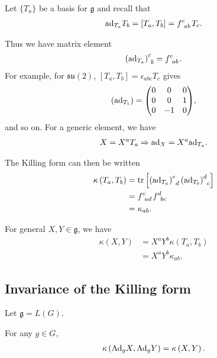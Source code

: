 Let $\{T_a\} $ be a basis for $\mathfrak{g}$ and recall that
\begin{align}
    \ad_{T_a} T_b = \left[ T_a, T_b \right] = \tensor{f}{^{c}_{ab}} T_c
.\end{align}

Thus we have matrix element
\begin{align}
    \tensor{\left( \ad_{T_a} \right) }{^{c}_b} = \tensor{f}{^{c}_{ab}}
.\end{align}
For example, for $\mathfrak{su}\left( 2 \right) $, $\left[ T_a, T_b \right] = \epsilon_{abc} T_c$ gives
\begin{align}
    \left( \ad_{T_1} \right) = \mqty( 0 & 0 & 0 \\ 0 & 0 & 1 \\ 0 & -1 & 0 )
,\end{align}
and so on. For a generic element, we have
\begin{align}
    X = X^{a} T_a \Rightarrow \text{ad}_X = X^{a} \text{ad}_{T_a}
.\end{align}

The Killing form can then be written
\begin{align}
    \kappa \left( T_a, T_b \right)  &= \tr \left[ \tensor{\left( \ad_{T_a} \right) }{^{e}_d} \tensor{\left( \ad_{T_b} \right) }{^{d}_c} \right]  \\
    &= \tensor{f}{^{c}_{ad}} \tensor{f}{^{d}_{bc}} \\
    &= \kappa_{ab}
.\end{align}

For general $X,Y \in \mathfrak{g}$, we have
\begin{align}
    \kappa \left( X,Y \right) &= X^{a} Y^{b} \kappa \left( T_a, T_b \right)\\
                              &= X^{a} Y^{b} \kappa_{ab}
.\end{align}

\subsection{Invariance of the Killing form}

Let $\mathfrak{g} = L \left( G \right) $.

\begin{claim}
    For any $g \in G$, 
    \begin{align}
        \kappa \left( \text{Ad}_g X, \text{Ad}_g Y \right) = \kappa \left( X,Y \right) 
    .\end{align}
\end{claim}

